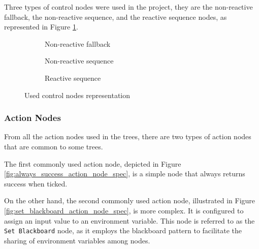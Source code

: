Three types of control nodes were used in the project, they are the non-reactive fallback, the non-reactive sequence, and the reactive sequence nodes, as represented in Figure \ref{fig:control_nodes_spec}.

\begin{figure}[!h]
    \centering
    \begin{subfigure}[b]{.32\linewidth}
        \centering
        \scalebox{.8} {
            \begin{forest}
            \end{forest}
        }
        \caption{Non-reactive fallback}
    \end{subfigure}
    \hfill
    \begin{subfigure}[b]{.32\linewidth}
        \centering
        \scalebox{.8} {
            \begin{forest}
            \end{forest}
        }
        \caption{Non-reactive sequence}
    \end{subfigure}
    \hfill
    \begin{subfigure}[b]{.32\linewidth}
        \centering
        \scalebox{.8} {
            \begin{forest}
            \end{forest}
        }
        \caption{Reactive sequence}
    \end{subfigure}
    \caption{Used control nodes representation}
    \label{fig:control_nodes_spec}
\end{figure}

\subsubsection{Action Nodes}
\label{subsubsec:common_action_nodes_spec}

From all the action nodes used in the trees, there are two types of action nodes that are common to some trees.

The first commonly used action node, depicted in Figure \ref{fig:always_success_action_node_spec}, is a simple node that always returns success when ticked.

On the other hand, the second commonly used action node, illustrated in Figure \ref{fig:set_blackboard_action_node_spec}, is more complex. It is configured to assign an input value to an environment variable. This node is referred to as the \texttt{Set Blackboard} node, as it employs the blackboard pattern to facilitate the sharing of environment variables among nodes.

